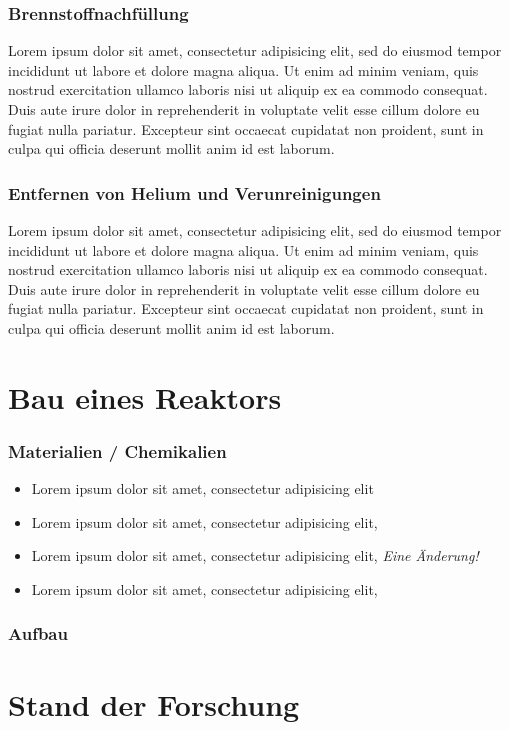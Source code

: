 \documentclass[aspectratio=169]{beamer}
\begin{document}
    \begin{frame}
      \frametitle{Brennstoffnachfüllung}
      Lorem ipsum dolor sit amet, consectetur adipisicing elit, sed do eiusmod tempor incididunt ut labore et dolore magna aliqua. Ut enim ad minim veniam, quis nostrud exercitation ullamco laboris nisi ut aliquip ex ea commodo consequat. Duis aute irure dolor in reprehenderit in voluptate velit esse cillum dolore eu fugiat nulla pariatur. Excepteur sint occaecat cupidatat non proident, sunt in culpa qui officia deserunt mollit anim id est laborum.
    \end{frame}

    \begin{frame}
      \frametitle{Entfernen von Helium und Verunreinigungen}
      Lorem ipsum dolor sit amet, consectetur adipisicing elit, sed do eiusmod tempor incididunt ut labore et dolore magna aliqua. Ut enim ad minim veniam, quis nostrud exercitation ullamco laboris nisi ut aliquip ex ea commodo consequat. Duis aute irure dolor in reprehenderit in voluptate velit esse cillum dolore eu fugiat nulla pariatur. Excepteur sint occaecat cupidatat non proident, sunt in culpa qui officia deserunt mollit anim id est laborum.
    \end{frame}

  \section{Bau eines Reaktors}

    \begin{frame}
      \frametitle{Materialien / Chemikalien}
      \begin{itemize}
        \item Lorem ipsum dolor sit amet, consectetur adipisicing elit
        \item Lorem ipsum dolor sit amet, consectetur adipisicing elit,
        \item Lorem ipsum dolor sit amet, consectetur adipisicing elit, \textit{Eine Änderung!}
        \item Lorem ipsum dolor sit amet, consectetur adipisicing elit,
      \end{itemize}
    \end{frame}

    \begin{frame}
      \frametitle{Aufbau}
    \end{frame}

  \section{Stand der Forschung}
\end{document}

